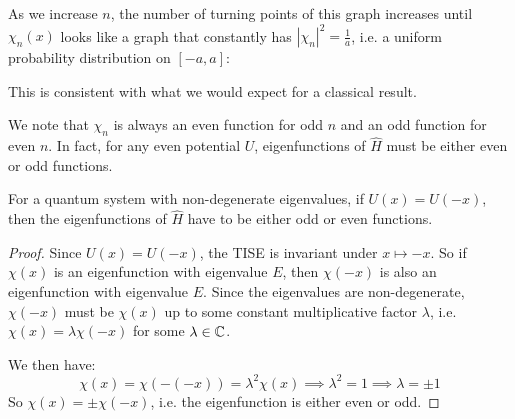 \documentclass[../main.tex]{subfiles}
\begin{document}
\begin{remark}
  As we increase $n$, the number of turning points of this graph increases until $\chi_n(x)$ looks like a graph that constantly has $|\chi_n|^2 = \frac{1}{a}$, i.e. a uniform probability distribution on $[-a, a]$:
  \begin{center}
  \end{center}
  This is consistent with what we would expect for a classical result.
\end{remark}
We note that $\chi_n$ is always an even function for odd $n$ and an odd function for even $n$.
In fact, for any even potential $U$, eigenfunctions of $\hat{H}$ must be either even or odd functions.
\begin{lemma}
  For a quantum system with non-degenerate eigenvalues, if $U(x) = U(-x)$, then the eigenfunctions of $\hat{H}$ have to be either odd or even functions. \label{evenOddEF}
\end{lemma}
\begin{proof}
  Since $U(x) = U(-x)$, the TISE is invariant under $x \mapsto -x$.
  So if $\chi(x)$ is an eigenfunction with eigenvalue $E$, then $\chi(-x)$ is also an eigenfunction with eigenvalue $E$.
  Since the eigenvalues are non-degenerate, $\chi(-x)$ must be $\chi(x)$ up to some constant multiplicative factor $\lambda$, i.e. $\chi(x) = \lambda\chi(-x)$ for some $\lambda \in \mathbb{C}$.

  We then have:
  \[
    \chi(x) = \chi(-(-x)) = \lambda^2 \chi(x) \implies \lambda^2 = 1 \implies \lambda = \pm 1
  \]
  So $\chi(x) = \pm\chi(-x)$, i.e. the eigenfunction is either even or odd.
\end{proof}
\end{document}
